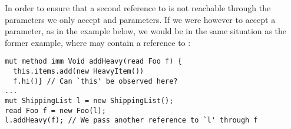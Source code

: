 In order to ensure that a second reference to \Q@this@ is not reachable through the parameters we only accept \Q@imm@ and \Q@capsule@ parameters.
If we were however to accept a \Q@read@ parameter, as in the example below,
we would be in the same situation as the former example, where \Q@f@ may contain
a reference to \Q@this@:
\saveSpace
\begin{lstlisting}
mut method imm Void addHeavy(read Foo f) {
  this.items.add(new HeavyItem())
  f.hi()} // Can `this' be observed here?
...
mut ShippingList l = new ShippingList();
read Foo f = new Foo(l);
l.addHeavy(f); // We pass another reference to `l' through f
\end{lstlisting}
\saveSpace




